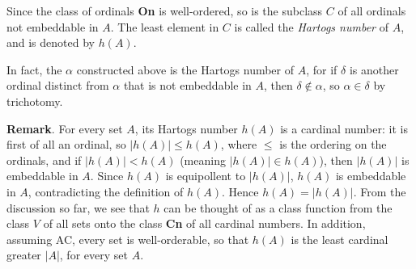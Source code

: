 \documentclass[12pt]{article}
\begin{document}
Since the class of ordinals \textbf{On} is well-ordered, so is the subclass $C$ of all ordinals not embeddable in $A$.  The least element in $C$ is called the \emph{Hartogs number} of $A$, and is denoted by $h(A)$.

In fact, the $\alpha$ constructed above is the Hartogs number of $A$, for if $\delta$ is another ordinal distinct from $\alpha$ that is not embeddable in $A$, then $\delta \notin \alpha$, so $\alpha\in \delta$ by trichotomy.

\textbf{Remark}.  For every set $A$, its Hartogs number $h(A)$ is a cardinal number: it is first of all an ordinal, so $|h(A)|\le h(A)$, where $\le$ is the ordering on the ordinals, and if $|h(A)| < h(A)$ (meaning $|h(A)|\in h(A)$), then $|h(A)|$ is embeddable in $A$.  Since $h(A)$ is equipollent to $|h(A)|$, $h(A)$ is embeddable in $A$, contradicting the definition of $h(A)$.  Hence $h(A)=|h(A)|$.  From the discussion so far, we see that $h$ can be thought of as a class function from the class $V$ of all sets onto the class \textbf{Cn} of all cardinal numbers.  In addition, assuming AC, every set is well-orderable, so that $h(A)$ is the least cardinal greater $|A|$, for every set $A$.
\end{document}
